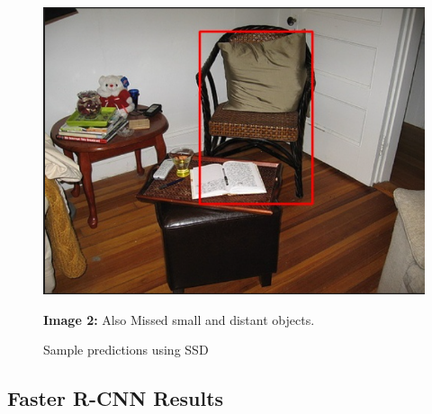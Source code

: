 \documentclass[12pt]{article}
\begin{document}
\begin{figure}[H]
\begin{minipage}[b]{0.45\textwidth}
        \includegraphics[width=\textwidth]{ssd_result2.png}
        \caption*{\textbf{Image 2:} Also Missed small and distant objects.}
    \end{minipage}
    \caption{Sample predictions using SSD}
\end{figure}

\subsection*{Faster R-CNN Results}
\end{document}

